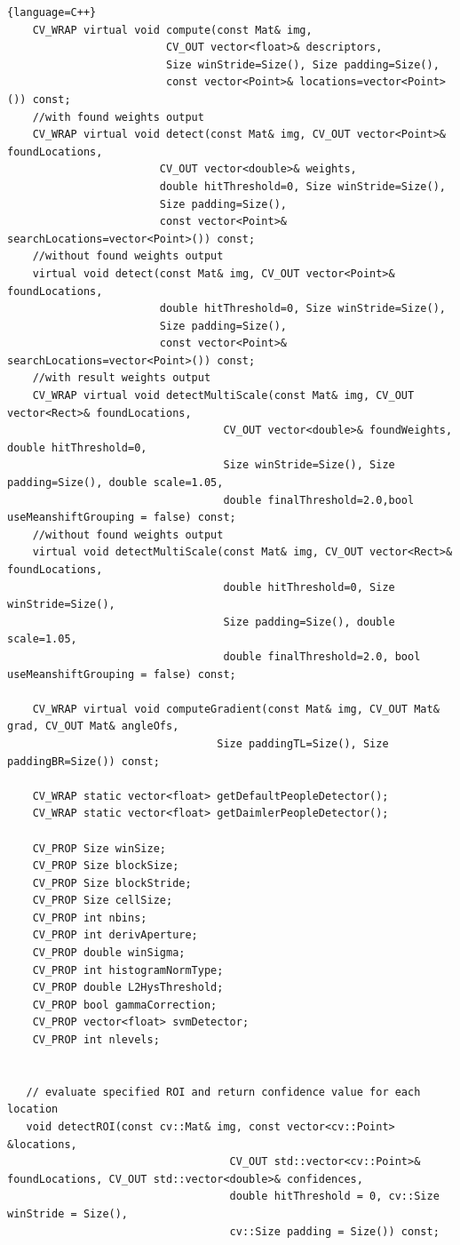 \documentclass[10pt,technote,onecolumn,twoside]{IEEEtran}
\begin{document}
\begin{lstlisting}{language=C++}
    CV_WRAP virtual void compute(const Mat& img,
                         CV_OUT vector<float>& descriptors,
                         Size winStride=Size(), Size padding=Size(),
                         const vector<Point>& locations=vector<Point>()) const;
    //with found weights output
    CV_WRAP virtual void detect(const Mat& img, CV_OUT vector<Point>& foundLocations,
                        CV_OUT vector<double>& weights,
                        double hitThreshold=0, Size winStride=Size(),
                        Size padding=Size(),
                        const vector<Point>& searchLocations=vector<Point>()) const;
    //without found weights output
    virtual void detect(const Mat& img, CV_OUT vector<Point>& foundLocations,
                        double hitThreshold=0, Size winStride=Size(),
                        Size padding=Size(),
                        const vector<Point>& searchLocations=vector<Point>()) const;
    //with result weights output
    CV_WRAP virtual void detectMultiScale(const Mat& img, CV_OUT vector<Rect>& foundLocations,
                                  CV_OUT vector<double>& foundWeights, double hitThreshold=0,
                                  Size winStride=Size(), Size padding=Size(), double scale=1.05,
                                  double finalThreshold=2.0,bool useMeanshiftGrouping = false) const;
    //without found weights output
    virtual void detectMultiScale(const Mat& img, CV_OUT vector<Rect>& foundLocations,
                                  double hitThreshold=0, Size winStride=Size(),
                                  Size padding=Size(), double scale=1.05,
                                  double finalThreshold=2.0, bool useMeanshiftGrouping = false) const;

    CV_WRAP virtual void computeGradient(const Mat& img, CV_OUT Mat& grad, CV_OUT Mat& angleOfs,
                                 Size paddingTL=Size(), Size paddingBR=Size()) const;

    CV_WRAP static vector<float> getDefaultPeopleDetector();
    CV_WRAP static vector<float> getDaimlerPeopleDetector();

    CV_PROP Size winSize;
    CV_PROP Size blockSize;
    CV_PROP Size blockStride;
    CV_PROP Size cellSize;
    CV_PROP int nbins;
    CV_PROP int derivAperture;
    CV_PROP double winSigma;
    CV_PROP int histogramNormType;
    CV_PROP double L2HysThreshold;
    CV_PROP bool gammaCorrection;
    CV_PROP vector<float> svmDetector;
    CV_PROP int nlevels;


   // evaluate specified ROI and return confidence value for each location
   void detectROI(const cv::Mat& img, const vector<cv::Point> &locations,
                                   CV_OUT std::vector<cv::Point>& foundLocations, CV_OUT std::vector<double>& confidences,
                                   double hitThreshold = 0, cv::Size winStride = Size(),
                                   cv::Size padding = Size()) const;


\end{lstlisting}
\end{document}
